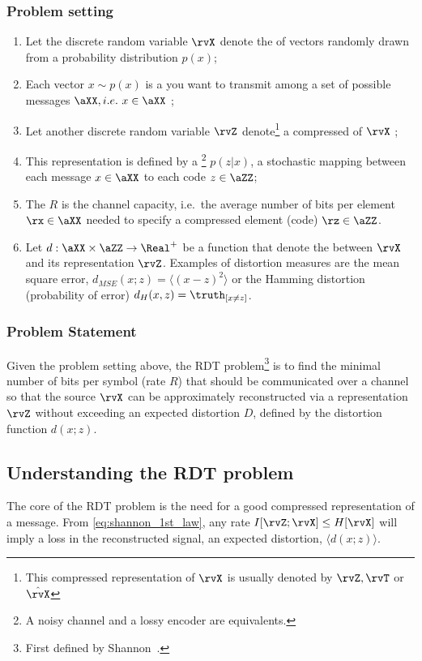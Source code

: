 \subsubsection{Problem setting}
\begin{enumerate}
	\item Let the discrete random variable $\rvX$ denote the  of vectors randomly drawn from a probability distribution \(p(x)\);
	\item Each vector \(x\sim p(x)\) is a  you want to transmit among a set of possible messages $\aXX,i.e.\  x \in \aXX$ ;
	\item Let another discrete random variable $\rvZ$ denote\footnote{This compressed representation of $\rvX$ is usually denoted by $\rvZ, \rvT$ or $\hat{\rvX}$ } a compressed  of $\rvX$ ;
	\item This representation is defined by a \footnote{A noisy channel and a lossy encoder are equivalents.} $p(z|x)$, a stochastic mapping  between each message $x \in \aXX$ to each code $z \in \aZZ$;
	\item The  $R$ is the channel capacity, i.e.\ the average number of bits per element $\rx \in \aXX$ needed to specify a compressed element (code) $\rz \in \aZZ$.
	\item Let $d: \aXX \times \aZZ \to \Real^{+}$ be a function that denote the  between $\rvX$ and its representation $\rvZ$. Examples of distortion measures are the mean square error, $d_{MSE}(x;z)=\langle (x - z)^2 \rangle$ or the Hamming distortion (probability of error) $d_{H}(x,z)=\truth_{[x \neq z]}$.
\end{enumerate}
\subsubsection{Problem Statement}
Given the problem setting above, the \ac*{RDT} problem\footnote{ First defined by Shannon~\cite{shannon:1948}.} is to find the minimal number of bits per symbol (rate $R$) that should be communicated over a channel so that the source $\rvX$ can be approximately reconstructed via a representation $\rvZ$ without exceeding an expected distortion $D$, defined by the distortion function $d(x;z)$.

\subsection{Understanding the \ac*{RDT} problem}
The core of the \ac*{RDT} problem is the need for a good compressed representation of a message. From \eqref{eq:shannon_1st_law}, any rate $I[\rvZ;\rvX] \leq H[\rvX]$ will imply a loss in the reconstructed signal, an expected distortion,  $\langle d(x;z) \rangle$.

